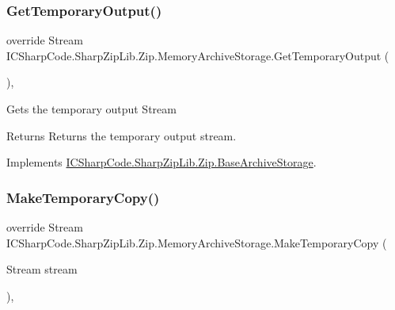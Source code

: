 \subsubsection{\texorpdfstring{Get\+Temporary\+Output()}{GetTemporaryOutput()}}
{\footnotesize\ttfamily override Stream I\+C\+Sharp\+Code.\+Sharp\+Zip\+Lib.\+Zip.\+Memory\+Archive\+Storage.\+Get\+Temporary\+Output (\begin{DoxyParamCaption}{ }\end{DoxyParamCaption})\hspace{0.3cm}{\ttfamily [inline]}, {\ttfamily [virtual]}}



Gets the temporary output Stream 

\begin{DoxyReturn}{Returns}
Returns the temporary output stream.
\end{DoxyReturn}


Implements \hyperlink{class_i_c_sharp_code_1_1_sharp_zip_lib_1_1_zip_1_1_base_archive_storage_a1327afcc22749a88959c9d8614cf4c75}{I\+C\+Sharp\+Code.\+Sharp\+Zip\+Lib.\+Zip.\+Base\+Archive\+Storage}.

\mbox{\label{class_i_c_sharp_code_1_1_sharp_zip_lib_1_1_zip_1_1_memory_archive_storage_aba8d53a76aa47b36feefb4e42a98b4d3}} 
\subsubsection{\texorpdfstring{Make\+Temporary\+Copy()}{MakeTemporaryCopy()}}
{\footnotesize\ttfamily override Stream I\+C\+Sharp\+Code.\+Sharp\+Zip\+Lib.\+Zip.\+Memory\+Archive\+Storage.\+Make\+Temporary\+Copy (\begin{DoxyParamCaption}\item[{Stream}]{stream }\end{DoxyParamCaption})\hspace{0.3cm}{\ttfamily [inline]}, {\ttfamily [virtual]}}



